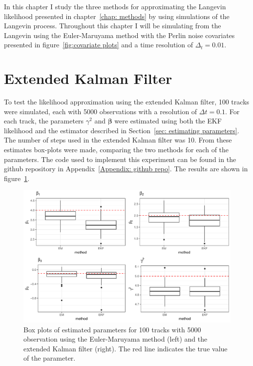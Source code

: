 


In this chapter I study the three methods for approximating the Langevin likelihood presented in chapter~\ref{chap: methods} by using simulations of the Langevin process. Throughout this chapter I will be simulating from the Langevin using the Euler-Maruyama method with the Perlin noise covariates presented in figure~\ref{fig:covariate plots} and a time resolution of $\Delta_t =0.01$.




\section{Extended Kalman Filter}
\label{sec: EKF test}
To test the likelihood approximation using the extended Kalman filter, 100 tracks were simulated, each with 5000 observations with a resolution of $\Delta t = 0.1$. For each track, the parameters $\gamma^2$ and $\bm \beta$ were estimated using both the EKF likelihood and the estimator described in Section~\ref{sec: estimating parameters}. The number of steps used in the extended Kalman filter was 10. From these estimates box-plots were made, comparing the two methods for each of the parameters. The code used to implement this experiment can be found in the github repository in Appendix~\ref{Appendix: github repo}. The results are shown in figure~\ref{fig:EKF_thin_boxplot}.

 

\begin{figure}[H]
    \centering
    \includegraphics[width=\linewidth]{Images/Results/EM EKF plot.pdf}
    \caption[Euler-Maruyama and extended Kalman filter estimates]{Box plots of estimated parameters for 100 tracks with 5000 observation using the Euler-Maruyama method (left) and the extended Kalman filter (right). The red line indicates the true value of the parameter.}
    \label{fig:EKF_thin_boxplot}
\end{figure}

